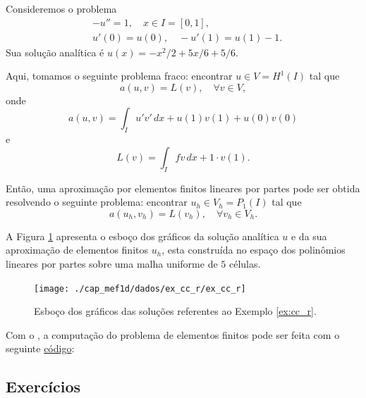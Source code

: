 \begin{ex}\label{ex:cc_n}
  Consideremos o problema
  \begin{align}
    &-u'' = 1,\quad x\in I=[0,1],\label{eq:ex_cc_r_eq}\\
    &u'(0) = u(0),\quad -u'(1) = u(1) - 1.\label{eq:ex_cc_r_bc}
  \end{align}
Sua solução analítica é $u(x) = -x^2/2+5x/6+5/6$. 

Aqui, tomamos o seguinte problema fraco: encontrar $u\in V=H^1(I)$ tal que
\begin{equation}
  a(u, v) = L(v),\quad\forall v\in V,
\end{equation}
onde
\begin{equation}
  a(u, v) = \int_I u'v'\,dx + u(1)v(1) + u(0)v(0)
\end{equation}
e
\begin{equation}
  L(v) = \int_I fv\,dx + 1\cdot v(1).
\end{equation}

Então, uma aproximação por elementos finitos lineares por partes pode ser obtida resolvendo o seguinte problema: encontrar $u_h\in V_h=P_1(I)$ tal que
\begin{equation}
  a(u_h, v_h) = L(v_h),\quad\forall v_h\in V_h.
\end{equation}

A Figura \ref{fig:ex_cc_r} apresenta o esboço dos gráficos da solução analítica $u$ e da sua aproximação de elementos finitos $u_h$, esta construída no espaço dos polinômios lineares por partes sobre uma malha uniforme de $5$ células.

\begin{figure}[h!]
  \centering
  \texttt{[image: ./cap\_mef1d/dados/ex\_cc\_r/ex\_cc\_r]}
  \caption{Esboço dos gráficos das soluções referentes ao Exemplo \ref{ex:cc_r}.}
  \label{fig:ex_cc_r}
\end{figure}

\ifispython
Com o \fenics, a computação do problema de elementos finitos pode ser feita com o seguinte \href{https://github.com/phkonzen/notas/blob/master/src/MetodoElementosFinitos/cap_mef1d/dados/ex_cc_r/ex_cc_r.py}{código}:

\fi
\end{ex}

\subsection*{Exercícios}

